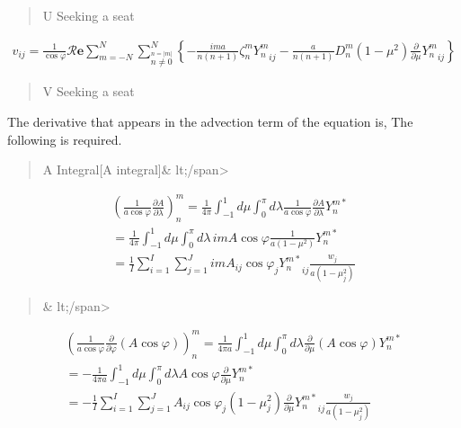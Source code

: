\begin{quote}
\blaze{[}U Seeking a seat
\end{quote}

\begin{eqnarray}
  v_{ij}
  = \frac{1}{\cos\varphi}
   {\mathcal R}\mathbf{e} \sum_{m=-N}^{N}
                     \sum_{\stackrel{n=|m|}{n \neq 0}}^{N}
    \left\{
          -  \frac{im a}{n(n+1)} \zeta_n^m {Y_n^m}_{ij}
          -  \frac{a}{n(n+1)} D_n^m
            (1-\mu^{2}) \frac{\partial }{\partial \mu} {Y_n^m}_{ij}
    \right\}
\end{eqnarray}

\begin{quote}
\blaze{[}V Seeking a seat
\end{quote}

The derivative that appears in the advection term of the equation is,
The following is required.

\begin{quote}
A Integral{[}A integral{]}\& lt;/span\textgreater{}
\end{quote}

\begin{eqnarray}
  \left( \frac{1}{a\cos\varphi} \frac{\partial A}{\partial \lambda} \right)_n^m
   =  \frac{1}{4 \pi}
        \int_{-1}^{1} d \mu \int_{0}^{\pi} d \lambda
          \frac{1}{a\cos\varphi} \frac{\partial A}{\partial \lambda} Y_n^{m *} \\
   =  \frac{1}{4 \pi}
        \int_{-1}^{1} d \mu \int_{0}^{\pi} d \lambda \,
          im A \cos\varphi \frac{1}{a(1-\mu^{2})} Y_n^{m *} \\
   =  \frac{1}{I} \sum_{i=1}^{I} \sum_{j=1}^{J}  
          im A_{ij} \cos\varphi_j
          {Y_n^{m *}}_{ij} \frac{w_j}{a(1-\mu_j^{2})}
\end{eqnarray}

\begin{quote}
\& lt;/span\textgreater{}
\end{quote}

\begin{eqnarray}
  \left( \frac{1}{a\cos\varphi}
         \frac{\partial }{\partial \varphi} (A\cos\varphi) \right)_n^m
    =  \frac{1}{4 \pi a}
         \int_{-1}^{1} d \mu \int_{0}^{\pi} d \lambda
           \frac{\partial }{\partial \mu} (A\cos\varphi) Y_n^{m *}  \\
    =  - \frac{1}{4 \pi a}
         \int_{-1}^{1} d \mu \int_{0}^{\pi} d \lambda
           A \cos\varphi \frac{\partial }{\partial \mu} Y_n^{m *}
            \\
   =  - \frac{1}{I} \sum_{i=1}^{I} \sum_{j=1}^{J}  
          A_{ij}  \cos\varphi_j
          (1-\mu_j^2)  \frac{\partial }{\partial \mu}
          {Y_n^{m *}}_{ij} \frac{w_j}{a(1-\mu_j^{2})}
\end{eqnarray}

